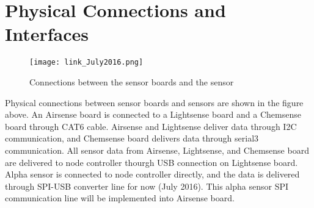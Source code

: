 \section{Physical Connections and Interfaces}

\begin{figure}[h]
\begin{center}
\texttt{[image: link\_July2016.png]}
\caption{Connections between the sensor boards and the sensor}
\label{fig:physicalConnections}
\end{center}
\end{figure}

Physical connections between sensor boards and sensors are shown in the figure above. An Airsense board is connected to a Lightsense board and a Chemsense board through CAT6 cable. Airsense and Lightsense deliver data through I2C communication, and Chemsense board delivers data through serial3 communication. All sensor data from Airsense, Lightsense, and Chemsense board are delivered to node controller thourgh USB connection on Lightsense board.
Alpha sensor is connected to node controller directly, and the data is delivered through SPI-USB converter line for now (July 2016). This alpha sensor SPI communication line will be implemented into Airsense board.